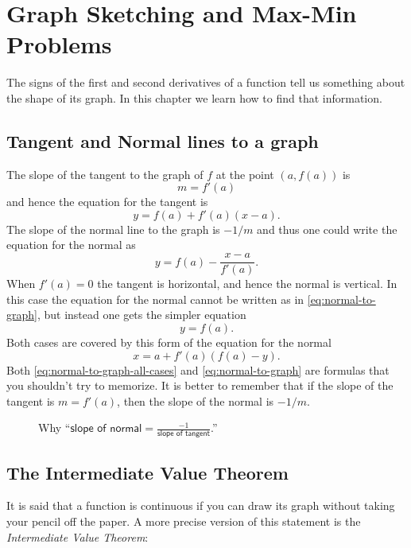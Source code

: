 
\chapter{Graph Sketching and Max-Min Problems}
\label{ch:graph-sketching}
The signs of the first and second derivatives of a function tell us something
about the shape of its graph.  In this chapter we learn how to find that
information.

\section{Tangent and Normal lines to a graph}
The slope of the tangent to the graph of $f$ at the point $(a,
f(a))$ is
\begin{equation}
  m = f'(a)
\end{equation}
and hence the equation for the tangent is
\begin{equation}
  \label{eq:tangent-to-graph}
  y = f(a) + f'(a) (x-a).
\end{equation}
The slope of the normal line to the graph is $-1/m$ and thus one could
write the equation for the normal as
\begin{equation}
  \label{eq:normal-to-graph}
  y=f(a) - \frac{x-a}{f'(a)}.
\end{equation}
When $f'(a)=0$ the tangent is horizontal, and hence the normal is
vertical.  In this case the equation for the normal cannot be written
as in \eqref{eq:normal-to-graph}, but instead one gets the simpler
equation
\[
y=f(a).
\]
Both cases are covered by this form of the equation for the normal
\begin{equation}
  \label{eq:normal-to-graph-all-cases}
  x=a+f'(a)(f(a)-y).
\end{equation}
Both \eqref{eq:normal-to-graph-all-cases} and \eqref{eq:normal-to-graph} are
formulas that you shouldn't try to memorize.  It is better to remember that if
the slope of the tangent is $m=f'(a)$, then the slope of the normal is $-1/m$.
\begin{figure}[h]
  \centering 
  \caption{Why ``$\displaystyle \textsf{slope of normal} =
    \frac{-1}{\textsf{slope of tangent}}$.''}
  \label{fig:05tangentAndNormal}
\end{figure}

\section{The Intermediate Value Theorem}
It is said that a function is continuous if you can draw its graph without
taking your pencil off the paper.  A more precise version of this statement is
the \textit{Intermediate Value Theorem}:

